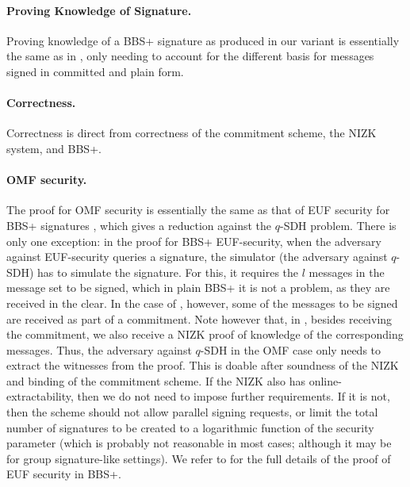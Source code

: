 \paragraph{Proving Knowledge of Signature.} %
Proving knowledge of a BBS+ signature as produced in our \SBCM variant
is essentially the same as in \cite{asm06,cdl16b}, only needing to account for
the different basis for messages signed in committed and plain form.

\paragraph{Correctness.} Correctness is direct from correctness of the
commitment scheme, the NIZK system, and BBS+.

\paragraph{OMF security.} The proof for OMF security is essentially the
same as that of EUF security for BBS+ signatures \cite{cdl16b}, which gives a
reduction against the $q$-SDH problem. There is only one exception: in the proof
for BBS+ EUF-security, when the adversary against EUF-security queries a
signature, the simulator (the adversary against $q$-SDH) has to simulate the
signature. For this, it requires the $l$ messages in the message set to be
signed, which in plain BBS+ it is not a problem, as they are received in the
clear. In the case of \SBCM, however, some of the messages to be signed are
received as part of a commitment. Note however that, in \SBCM, besides receiving
the commitment, we also receive a NIZK proof of knowledge of the corresponding
messages. Thus, the adversary against $q$-SDH in the OMF case only needs to
extract the witnesses from the proof. This is doable after soundness of the NIZK
and binding of the commitment scheme. %
If the NIZK also has online-extractability, then we do not need to impose
further requirements. If it is not, then the \SBCM scheme should not allow
parallel signing requests, or limit the total number of signatures to be
created to a logarithmic function of the security parameter (which is probably
not reasonable in most cases; although it may be for group signature-like
settings). We refer to \cite[Lemma 1]{cdl16b} for the full details of the proof
of EUF security in BBS+.
%

